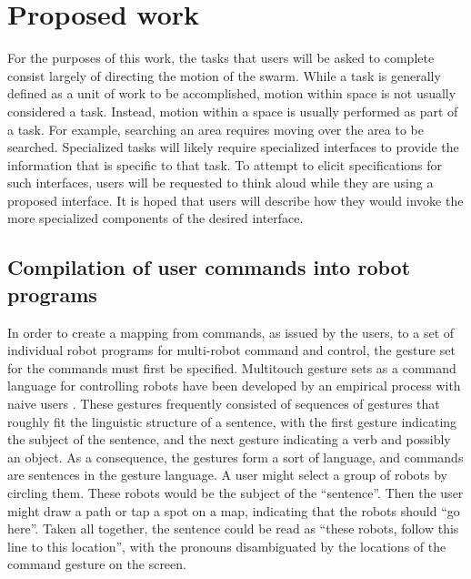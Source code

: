 \documentclass[]{article}
\begin{document}
\section{Proposed work}

For the purposes of this work, the tasks that users will be asked to complete consist largely of directing the motion of the swarm. 
While a task is generally defined as a unit of work to be accomplished, motion within space is not usually considered a task. 
Instead, motion within a space is usually performed as part of a task.
For example, searching an area requires moving over the area to be searched.
Specialized tasks will likely require specialized interfaces to provide the information that is specific to that task. 
To attempt to elicit specifications for such interfaces, users will be requested to think aloud while they are using a proposed interface. 
It is hoped that users will describe how they would invoke the more specialized components of the desired interface. 

\subsection{Compilation of user commands into robot programs}

In order to create a mapping from commands, as issued by the users, to a set of individual robot programs for multi-robot command and control, the gesture set for the commands must first be specified. 
Multitouch gesture sets as a command language for controlling robots have been developed by an empirical process with naive users \cite{Micire:2009:ANG:1731903.1731912}. 
These gestures frequently consisted of sequences of gestures that roughly fit the linguistic structure of a sentence, with the first gesture indicating the subject of the sentence, and the next gesture indicating a verb and possibly an object. 
As a consequence, the gestures form a sort of language, and commands are sentences in the gesture language.
A user might select a group of robots by circling them. 
These robots would be the subject of the ``sentence''.
Then the user might draw a path or tap a spot on a map, indicating that the robots should ``go here''. 
Taken all together, the sentence could be read as ``these robots, follow this line to this location'', with the pronouns disambiguated by the locations of the command gesture on the screen.
\end{document}
